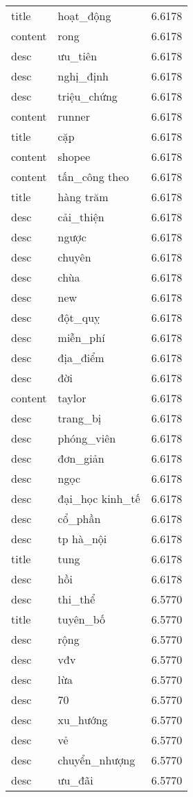 \documentclass{article}
\begin{document}
\begin{tabular}{lll}
title & hoạt\_động & 6.6178\\
content & rong & 6.6178\\
desc & ưu\_tiên & 6.6178\\
desc & nghị\_định & 6.6178\\
desc & triệu\_chứng & 6.6178\\
content & runner & 6.6178\\
title & cặp & 6.6178\\
content & shopee & 6.6178\\
content & tấn\_công theo & 6.6178\\
title & hàng trăm & 6.6178\\
desc & cải\_thiện & 6.6178\\
desc & ngược & 6.6178\\
desc & chuyên & 6.6178\\
desc & chùa & 6.6178\\
desc & new & 6.6178\\
desc & đột\_quỵ & 6.6178\\
desc & miễn\_phí & 6.6178\\
desc & địa\_điểm & 6.6178\\
desc & đời & 6.6178\\
content & taylor & 6.6178\\
desc & trang\_bị & 6.6178\\
desc & phóng\_viên & 6.6178\\
desc & đơn\_giản & 6.6178\\
desc & ngọc & 6.6178\\
desc & đại\_học kinh\_tế & 6.6178\\
desc & cổ\_phần & 6.6178\\
desc & tp hà\_nội & 6.6178\\
title & tung & 6.6178\\
desc & hồi & 6.6178\\
desc & thi\_thể & 6.5770\\
title & tuyên\_bố & 6.5770\\
desc & rộng & 6.5770\\
desc & vđv & 6.5770\\
desc & lừa & 6.5770\\
desc & 70 & 6.5770\\
desc & xu\_hướng & 6.5770\\
desc & vẻ & 6.5770\\
desc & chuyển\_nhượng & 6.5770\\
desc & ưu\_đãi & 6.5770\\

\end{tabular}
\end{document}
